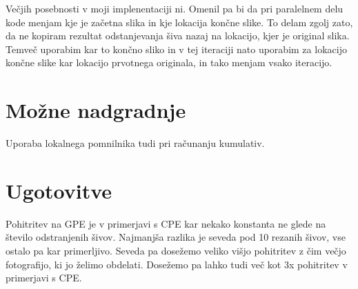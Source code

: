\documentclass[11pt,a4paper]{article}
\begin{document}
Večjih posebnosti v moji implenentaciji ni. Omenil pa bi da pri paralelnem delu
kode menjam kje je začetna slika in kje lokacija končne slike. To delam zgolj
zato, da ne kopiram rezultat odstanjevanja šiva nazaj na lokacijo, kjer je
original slika. Temveč uporabim kar to končno sliko in v tej iteraciji nato
uporabim za lokacijo končne slike kar lokacijo prvotnega originala, in tako menjam
vsako iteracijo.

\section{Možne nadgradnje}

Uporaba lokalnega pomnilnika tudi pri računanju kumulativ.

\section{Ugotovitve}

Pohitritev na GPE je v primerjavi s CPE kar nekako konstanta ne glede na število
odstranjenih šivov. Najmanjša razlika je seveda pod 10 rezanih šivov, vse ostalo
pa kar primerljivo. Seveda pa dosežemo veliko višjo pohitritev z čim večjo
fotografijo, ki jo želimo obdelati. Dosežemo pa lahko tudi več kot 3x pohitritev
 v primerjavi s CPE.
\end{document}
